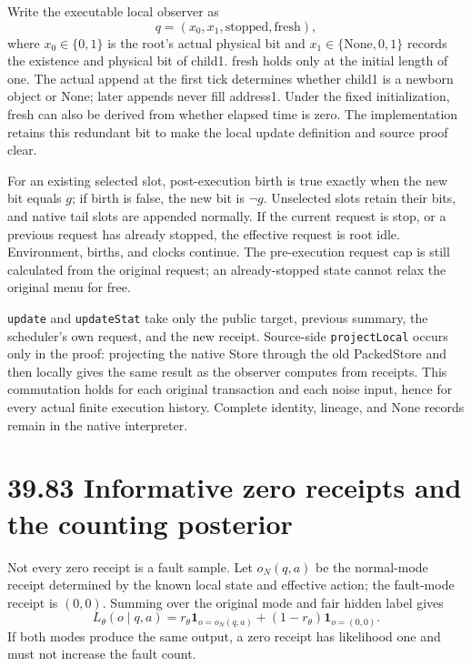 \documentclass[
  english,
  11pt,
  oneside]{book}
\begin{document}
Write the executable local observer as \[q=(x_0,x_1,\mathrm{stopped},\mathrm{fresh}),\] where \(x_0\in\{0,1\}\) is the root's actual physical bit and \(x_1\in\{\mathrm{None},0,1\}\) records the existence and physical bit of child1. fresh holds only at the initial length of one. The actual append at the first tick determines whether child1 is a newborn object or None; later appends never fill address1. Under the fixed initialization, fresh can also be derived from whether elapsed time is zero. The implementation retains this redundant bit to make the local update definition and source proof clear.

For an existing selected slot, post-execution birth is true exactly when the new bit equals \(g\); if birth is false, the new bit is \(\neg g\). Unselected slots retain their bits, and native tail slots are appended normally. If the current request is stop, or a previous request has already stopped, the effective request is root idle. Environment, births, and clocks continue. The pre-execution request cap is still calculated from the original request; an already-stopped state cannot relax the original menu for free.

\texttt{update} and \texttt{updateStat} take only the public target, previous summary, the scheduler's own request, and the new receipt. Source-side \texttt{projectLocal} occurs only in the proof: projecting the native Store through the old PackedStore and then locally gives the same result as the observer computes from receipts. This commutation holds for each original transaction and each noise input, hence for every actual finite execution history. Complete identity, lineage, and None records remain in the native interpreter.

\newpage

\section{39.83 Informative zero receipts and the counting posterior}\label{informative-zero-receipts-and-the-counting-posterior}

Not every zero receipt is a fault sample. Let \(o_N(q,a)\) be the normal-mode receipt determined by the known local state and effective action; the fault-mode receipt is \((0,0)\). Summing over the original mode and fair hidden label gives \[L_\theta(o\mid q,a)=r_\theta\mathbf1_{o=o_N(q,a)}+(1-r_\theta)\mathbf1_{o=(0,0)}.\] If both modes produce the same output, a zero receipt has likelihood one and must not increase the fault count.
\end{document}
